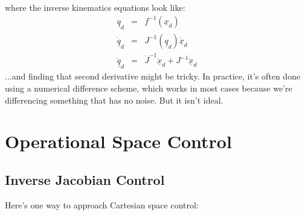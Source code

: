 \documentclass[]{article}
\begin{document}
where the inverse kinematics equations look like:
\begin{eqnarray}
\underline{q}_{d} & = & f^{-1}(\underline{x}_{d}) \nonumber \\
\underline{\dot{q}}_{d} & = & J^{-1}(\underline{q}_{d})\underline{\dot{x}}_{d} \nonumber \\
\underline{\ddot{q}}_{d} & = & \dot{J}^{-1}\underline{\dot{x}}_{d} + J^{-1}\underline{\ddot{x}}_{d} \nonumber
\end{eqnarray}
...and finding that second derivative might be tricky. In practice, it's often done using a numerical difference scheme, which works in most cases because we're differencing something that has no noise. But it isn't ideal.

\section{Operational Space Control}
\subsection{Inverse Jacobian Control}
Here's one way to approach Cartesian space control:
\end{document}
